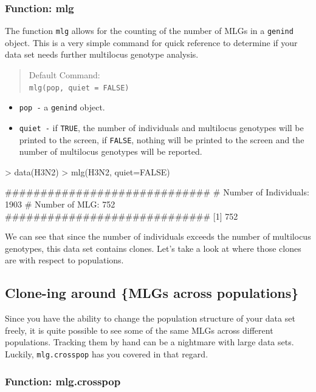 \documentclass[letterpaper]{article}
\newcommand{\tab}{\hspace*{1em}}
\begin{document}
\subsubsection{Function: mlg}\label{mlg:mlg:mlg}

\tab\tab The function \texttt{mlg} allows for the counting of the number of MLGs in a \texttt{genind} object. This is a very simple command for quick reference to determine if your data set needs further multilocus genotype analysis.
\begin{quote}
Default Command:\\
\texttt{mlg(pop, quiet = FALSE)}
\end{quote}
  \begin{itemize}
    \item \texttt{pop -} a \texttt{genind} object.
    \item \texttt{quiet -} if \texttt{TRUE}, the number of individuals and multilocus genotypes will be printed to the screen, if \texttt{FALSE}, nothing will be printed to the screen and the number of multilocus genotypes will be reported.
  \end{itemize}
\begin{Schunk}
\begin{Sinput}
> data(H3N2)
> mlg(H3N2, quiet=FALSE)
\end{Sinput}
\begin{Soutput}
#############################
# Number of Individuals: 1903 
# Number of MLG: 752 
#############################
[1] 752
\end{Soutput}
\end{Schunk}
We can see that since the number of individuals exceeds the number of multilocus genotypes, this data set contains clones. Let's take a look at where those clones are with respect to populations.
\subsection{Clone-ing around \{MLGs across populations\}}\label{mlg:cross}

\tab\tab Since you have the ability to change the population structure of your data set freely, it is quite possible to see some of the same MLGs across different populations. Tracking them by hand can be a nightmare with large data sets. Luckily, \texttt{mlg.crosspop} has you covered in that regard.
\subsubsection{Function: mlg.crosspop}\label{mlg:cross:mlg.crosspop}
\end{document}
